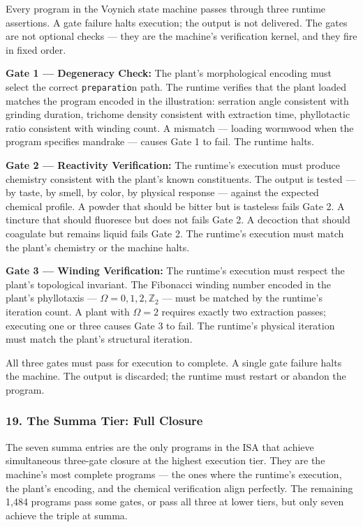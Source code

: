 \documentclass[12pt,a4paper]{article}
\begin{document}
Every program in the Voynich state machine passes through three runtime
assertions. A gate failure halts execution; the output is not delivered.
The gates are not optional checks --- they are the machine's
verification kernel, and they fire in fixed order.

\textbf{Gate 1 --- Degeneracy Check:} The plant's morphological encoding
must select the correct \texttt{preparatio}n path. The runtime verifies
that the plant loaded matches the program encoded in the illustration:
serration angle consistent with grinding duration, trichome density
consistent with extraction time, phyllotactic ratio consistent with
winding count. A mismatch --- loading wormwood when the program
specifies mandrake --- causes Gate 1 to fail. The runtime halts.

\textbf{Gate 2 --- Reactivity Verification:} The runtime's execution
must produce chemistry consistent with the plant's known constituents.
The output is tested --- by taste, by smell, by color, by physical
response --- against the expected chemical profile. A powder that should
be bitter but is tasteless fails Gate 2. A tincture that should
fluoresce but does not fails Gate 2. A decoction that should coagulate
but remains liquid fails Gate 2. The runtime's execution must match the
plant's chemistry or the machine halts.

\textbf{Gate 3 --- Winding Verification:} The runtime's execution must
respect the plant's topological invariant. The Fibonacci winding number
encoded in the plant's phyllotaxis ---
\(\Omega = 0, 1, 2, \mathbb{Z}_2\) --- must be matched by the runtime's
iteration count. A plant with \(\Omega = 2\) requires exactly two
extraction passes; executing one or three causes Gate 3 to fail. The
runtime's physical iteration must match the plant's structural
iteration.

All three gates must pass for execution to complete. A single gate
failure halts the machine. The output is discarded; the runtime must
restart or abandon the program.

\hypertarget{the-summa-tier-full-closure}{%
\subsubsection{19. The Summa Tier: Full
Closure}\label{the-summa-tier-full-closure}}

The seven summa entries are the only programs in the ISA that achieve
simultaneous three-gate closure at the highest execution tier. They are
the machine's most complete programs --- the ones where the runtime's
execution, the plant's encoding, and the chemical verification align
perfectly. The remaining 1,484 programs pass some gates, or pass all
three at lower tiers, but only seven achieve the triple at summa.
\end{document}
